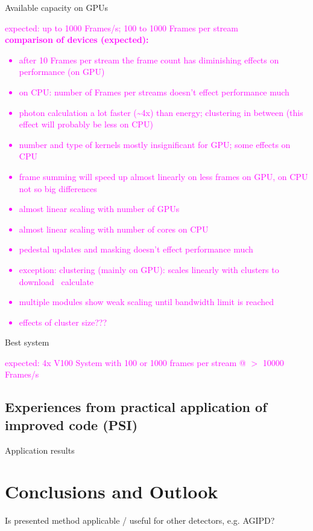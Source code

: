 \documentclass[a4paper]{article}
\begin{document}
Available capacity on GPUs\\

\textcolor{magenta}{
expected: up to 1000 Frames/s; 100 to 1000 Frames per stream \\
\textbf{comparison of devices (expected):}
\begin{itemize}
	\item after 10 Frames per stream the frame count has diminishing effects on performance (on GPU)
	\item on CPU: number of Frames per streams doesn't effect performance much
	\item photon calculation a lot faster (\textasciitilde4x) than energy; clustering in between (this effect will probably be less on CPU)
	\item number and type of kernels mostly insignificant for GPU; some effects on CPU
	\item frame summing will speed up almost linearly on less frames on GPU, on CPU not so big differences
	\item almost linear scaling with number of GPUs
	\item almost linear scaling with number of cores on CPU
	\item pedestal updates and masking doesn't effect performance much
	\item exception: clustering (mainly on GPU): scales linearly with clusters to download \ calculate
	\item multiple modules show weak scaling until bandwidth limit is reached
	\item effects of cluster size???
\end{itemize}
}

Best system

\textcolor{magenta}{
	expected: 4x V100 System with 100 or 1000 frames per stream @ $>$ 10000 Frames/s
}

\subsection{Experiences from practical application of improved code (PSI)}
Application results

\section{Conclusions and Outlook}
\label{sec:conclusions}
Is presented method applicable / useful for other detectors, e.g. AGIPD? \\
\end{document}
